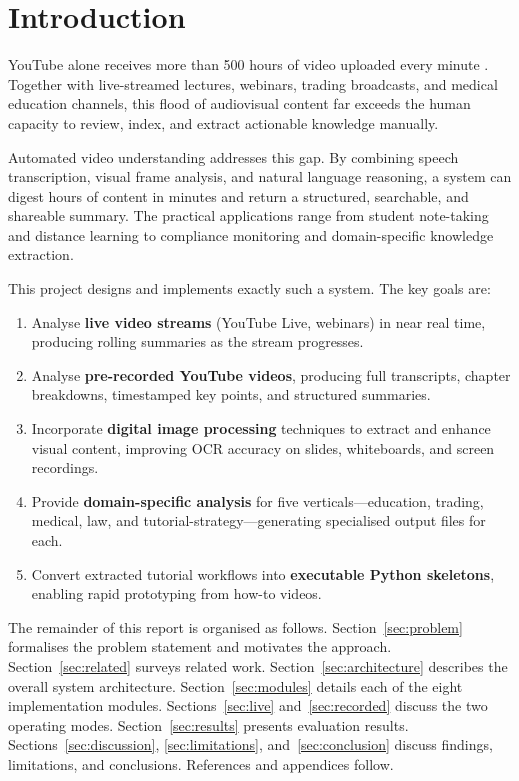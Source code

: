 \documentclass[12pt,a4paper]{article}
\begin{document}
\section{Introduction}

YouTube alone receives more than 500 hours of video uploaded every minute
\cite{youtube_stats}. Together with live-streamed lectures, webinars, trading
broadcasts, and medical education channels, this flood of audiovisual content far
exceeds the human capacity to review, index, and extract actionable knowledge
manually.

Automated video understanding addresses this gap. By combining speech transcription,
visual frame analysis, and natural language reasoning, a system can digest hours of
content in minutes and return a structured, searchable, and shareable summary. The
practical applications range from student note-taking and distance learning to
compliance monitoring and domain-specific knowledge extraction.

This project designs and implements exactly such a system. The key goals are:
\begin{enumerate}[leftmargin=*]
  \item Analyse \textbf{live video streams} (YouTube Live, webinars) in near real time,
        producing rolling summaries as the stream progresses.
  \item Analyse \textbf{pre-recorded YouTube videos}, producing full transcripts,
        chapter breakdowns, timestamped key points, and structured summaries.
  \item Incorporate \textbf{digital image processing} techniques to extract and enhance
        visual content, improving OCR accuracy on slides, whiteboards, and screen recordings.
  \item Provide \textbf{domain-specific analysis} for five verticals—education, trading,
        medical, law, and tutorial-strategy—generating specialised output files for each.
  \item Convert extracted tutorial workflows into \textbf{executable Python skeletons},
        enabling rapid prototyping from how-to videos.
\end{enumerate}

The remainder of this report is organised as follows. Section~\ref{sec:problem}
formalises the problem statement and motivates the approach. Section~\ref{sec:related}
surveys related work. Section~\ref{sec:architecture} describes the overall system
architecture. Section~\ref{sec:modules} details each of the eight implementation
modules. Sections~\ref{sec:live} and~\ref{sec:recorded} discuss the two operating
modes. Section~\ref{sec:results} presents evaluation results. Sections~\ref{sec:discussion},
\ref{sec:limitations}, and~\ref{sec:conclusion} discuss findings, limitations, and
conclusions. References and appendices follow.
\end{document}
